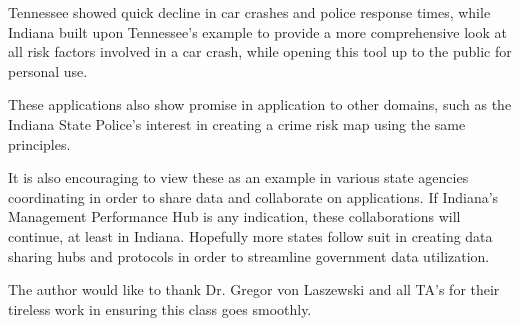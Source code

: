 \documentclass[sigconf]{acmart}
\begin{document}
Tennessee showed quick decline in car crashes and police response times, while Indiana built upon Tennessee's example to provide a more comprehensive look at all risk factors involved in a car crash, while opening this tool up to the public for personal use. 

These applications also show promise in application to other domains, such as the Indiana State Police's interest in creating a crime risk map using the same principles. 

It is also encouraging to view these as an example in various state agencies coordinating in order to share data and collaborate on applications. If Indiana's Management Performance Hub is any indication, these collaborations will continue, at least in Indiana. Hopefully more states follow suit in creating data sharing hubs and protocols in order to streamline government data utilization.

\begin{acks}

  The author would like to thank Dr. Gregor von Laszewski and all TA's for their tireless work in ensuring this class goes smoothly.

\end{acks}


 

\appendix


\end{document}
